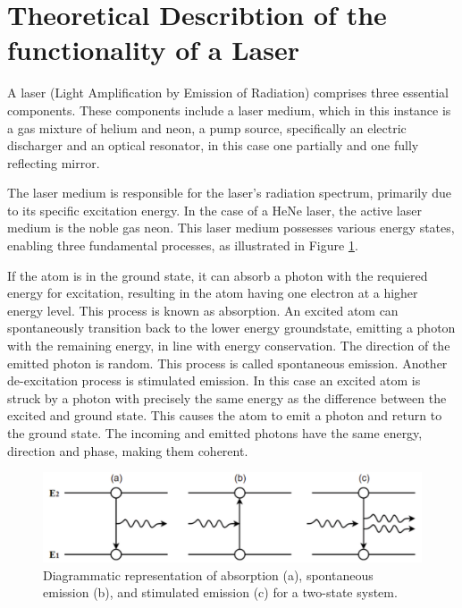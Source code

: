 \section{Theoretical Describtion of the functionality of a Laser}
\label{sec:theory}

A laser (Light Amplification by Emission of Radiation) comprises
three essential components. These components include a laser medium, 
which in this instance is a gas mixture of helium and neon, a pump
source, specifically an electric discharger and an optical resonator, 
in this case one partially and one fully reflecting mirror.

The laser medium is responsible for the laser's radiation spectrum, 
primarily due to its specific excitation energy. In the case 
of a HeNe laser, the active laser medium is the noble gas neon. 
This laser medium possesses various energy states, enabling three 
fundamental processes, as illustrated in Figure \ref{fig:emission}.

If the atom is in the ground state, it can absorb a photon with
the requiered energy for excitation, resulting in the atom having 
one electron at a higher energy level. This process is known as 
absorption. An excited atom can spontaneously transition back 
to the lower energy groundstate, emitting a photon with the remaining 
energy, in line with energy conservation. The direction of the emitted
photon is random. This process is called spontaneous emission.
Another de-excitation process is stimulated emission. In this case
an excited atom is struck by a photon with precisely the same 
energy as the difference between the excited and ground state. 
This causes the atom to emit a photon and return to the ground state.
The incoming and emitted photons have the same energy, direction and 
phase, making them coherent.

\begin{figure}
    \centering
    \includegraphics[width=0.8\linewidth]{pictures/emission.png} %
    \caption{Diagrammatic representation of absorption (a), spontaneous emission (b), and stimulated emission (c) for a two-state system. \cite{emission}}
    \label{fig:emission}
\end{figure}

